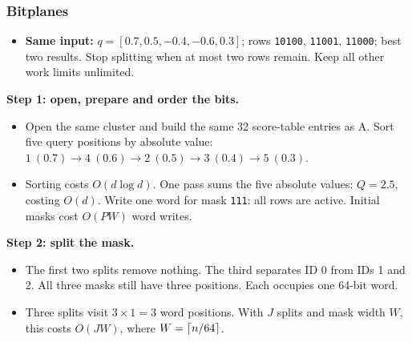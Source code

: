 \newpage
\subsubsection{Bitplanes}
\begin{itemize}
\item \textbf{Same input:} $q=[0.7,0.5,-0.4,-0.6,0.3]$; rows \texttt{10100}, \texttt{11001}, \texttt{11000}; best two results. Stop splitting when at most two rows remain. Keep all other work limits unlimited.
\end{itemize}

\textbf{Step 1: open, prepare and order the bits.}
\begin{itemize}
\item Open the same cluster and build the same 32 score-table entries as A. Sort five query positions by absolute value:
$1\ (0.7)\to4\ (0.6)\to2\ (0.5)\to3\ (0.4)\to5\ (0.3)$.
\item Sorting costs $O(d\log d)$. One pass sums the five absolute values: $Q=2.5$, costing $O(d)$. Write one word for mask \texttt{111}: all rows are active. Initial masks cost $O(PW)$ word writes.
\end{itemize}

\textbf{Step 2: split the mask.}
\begin{center}
\end{center}
\begin{itemize}
\item The first two splits remove nothing. The third separates ID 0 from IDs 1 and 2. All three masks still have three positions. Each occupies one 64-bit word.
\item Three splits visit $3\times1=3$ word positions. With $J$ splits and mask width $W$,
this costs $O(JW)$, where $W=\left\lceil n/64\right\rceil$.
\end{itemize}

